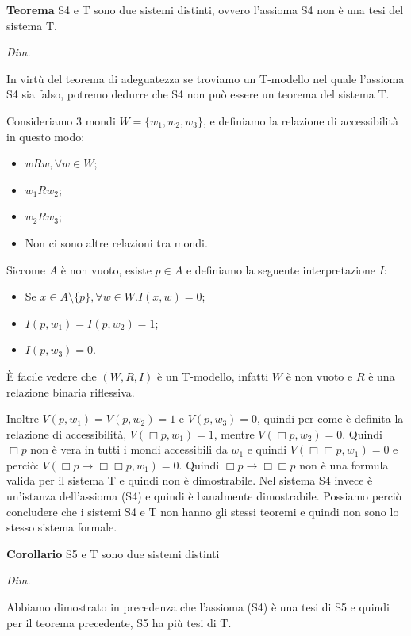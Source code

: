 \documentclass[a4paper, 12pt]{article}
\begin{document}
\begin{flushleft}
\textbf{Teorema}
S4 e T sono due sistemi distinti, ovvero l'assioma S4 non è una tesi del sistema T.

\textit{Dim.}

In virtù del teorema di adeguatezza se troviamo un T-modello nel quale l'assioma S4
sia falso, potremo dedurre che S4 non può essere un teorema del sistema T.

Consideriamo 3 mondi $W = \{w_1, w_2, w_3\}$, e definiamo la relazione di accessibilità
in questo modo:
\begin{itemize}
    \item $wRw, \forall w \in W$;
    \item $w_1Rw_2$;
    \item $w_2Rw_3$;
    \item Non ci sono altre relazioni tra mondi.
\end{itemize}

Siccome $A$ è non vuoto, esiste $p \in A$ e definiamo la seguente interpretazione $I:$
\begin{itemize}
    \item Se $x \in A \setminus \{p\}, \forall w \in W. I(x, w) = 0$;
    \item $I(p, w_1) = I(p, w_2) = 1$;
    \item $I(p, w_3) = 0$.
\end{itemize}

È facile vedere che $(W, R, I)$ è un T-modello, infatti $W$ è non vuoto e $R$ è una relazione binaria riflessiva.

Inoltre $V(p, w_1) = V(p, w_2) = 1$ e $V(p, w_3) = 0$, quindi per come è definita
la relazione di accessibilità, $V(\Box p, w_1) = 1$, mentre
$V(\Box p, w_2) = 0$. Quindi $\Box p$ non è vera in tutti i mondi accessibili da $w_1$
e quindi $V(\Box \Box p, w_1) = 0$ e perciò: $V(\Box p \rightarrow \Box\Box p, w_1) = 0$.
Quindi $\Box p \rightarrow \Box\Box p$ non è una formula valida per il sistema T e quindi
non è dimostrabile.
Nel sistema S4 invece è un'istanza dell'assioma (S4) e quindi è banalmente dimostrabile.
Possiamo perciò concludere che i sistemi S4 e T non hanno gli stessi teoremi e quindi non
sono lo stesso sistema formale.


\end{flushleft}

\begin{flushleft}
\textbf{Corollario}
S5 e T sono due sistemi distinti

\textit{Dim.}

Abbiamo dimostrato in precedenza che l'assioma (S4) è una tesi di S5 e quindi
per il teorema precedente, S5 ha più tesi di T.
\end{flushleft}
\end{document}
